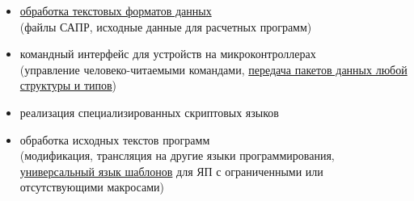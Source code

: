
\begin{itemize}
\item \underline{обработка текстовых форматов данных}\\
(файлы САПР, исходные данные для расчетных программ)
\item командный интерфейс для устройств на микроконтроллерах\\
(управление человеко-читаемыми командами, \underline{передача пакетов данных
любой структуры и типов})
\item реализация специализированных скриптовых языков
\item обработка исходных текстов программ\\
(модификация, трансляция на другие языки программирования,\\ 
\underline{универсальный язык шаблонов}
для ЯП с ограниченными или отсутствующими макросами)
\end{itemize}